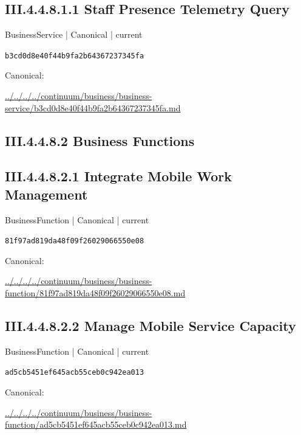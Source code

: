 \documentclass[10pt,a4paper]{article}
\begin{document}
\subsection*{III.4.4.8.1.1 Staff Presence Telemetry Query}
\label{element-b3cd0d8e40f44b9fa2b64367237345fa}
{\small BusinessService | Canonical | current}\par
\texttt{b3cd0d8e40f44b9fa2b64367237345fa}\par
Canonical: \par
{\footnotesize\url{../../../../continuum/business/business-service/b3cd0d8e40f44b9fa2b64367237345fa.md}}\par
\subsection*{III.4.4.8.2 Business Functions}
\subsection*{III.4.4.8.2.1 Integrate Mobile Work Management}
\label{element-81f97ad819da48f09f26029066550e08}
{\small BusinessFunction | Canonical | current}\par
\texttt{81f97ad819da48f09f26029066550e08}\par
Canonical: \par
{\footnotesize\url{../../../../continuum/business/business-function/81f97ad819da48f09f26029066550e08.md}}\par
\subsection*{III.4.4.8.2.2 Manage Mobile Service Capacity}
\label{element-ad5cb5451ef645acb55ceb0c942ea013}
{\small BusinessFunction | Canonical | current}\par
\texttt{ad5cb5451ef645acb55ceb0c942ea013}\par
Canonical: \par
{\footnotesize\url{../../../../continuum/business/business-function/ad5cb5451ef645acb55ceb0c942ea013.md}}\par
\end{document}
